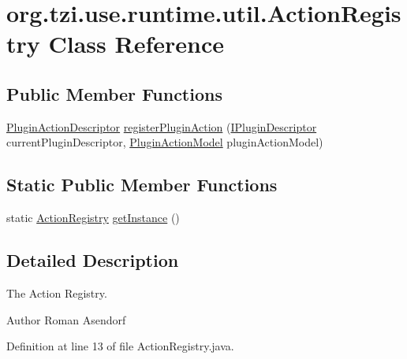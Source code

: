 \hypertarget{classorg_1_1tzi_1_1use_1_1runtime_1_1util_1_1_action_registry}{\section{org.\-tzi.\-use.\-runtime.\-util.\-Action\-Registry Class Reference}
\label{classorg_1_1tzi_1_1use_1_1runtime_1_1util_1_1_action_registry}
}
\subsection*{Public Member Functions}
\begin{DoxyCompactItemize}
\item 
\hyperlink{classorg_1_1tzi_1_1use_1_1runtime_1_1gui_1_1impl_1_1_plugin_action_descriptor}{Plugin\-Action\-Descriptor} \hyperlink{classorg_1_1tzi_1_1use_1_1runtime_1_1util_1_1_action_registry_ad21002d6d8e2aa841fc9345061d3cbd2}{register\-Plugin\-Action} (\hyperlink{interfaceorg_1_1tzi_1_1use_1_1runtime_1_1_i_plugin_descriptor}{I\-Plugin\-Descriptor} current\-Plugin\-Descriptor, \hyperlink{classorg_1_1tzi_1_1use_1_1runtime_1_1model_1_1_plugin_action_model}{Plugin\-Action\-Model} plugin\-Action\-Model)
\end{DoxyCompactItemize}
\subsection*{Static Public Member Functions}
\begin{DoxyCompactItemize}
\item 
static \hyperlink{classorg_1_1tzi_1_1use_1_1runtime_1_1util_1_1_action_registry}{Action\-Registry} \hyperlink{classorg_1_1tzi_1_1use_1_1runtime_1_1util_1_1_action_registry_a4abcea32dec8fb6421da43eb98425e02}{get\-Instance} ()
\end{DoxyCompactItemize}


\subsection{Detailed Description}
The Action Registry.

\begin{DoxyAuthor}{Author}
Roman Asendorf 
\end{DoxyAuthor}


Definition at line 13 of file Action\-Registry.\-java.



